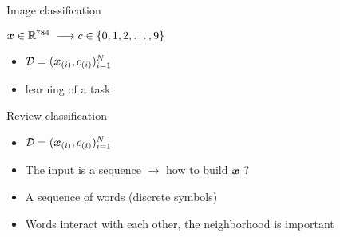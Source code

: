 \begin{frame}{Image classification}
  \begin{center}
    $\boldsymbol{x} \in \mathbb{R}^{784} \ \longrightarrow {c}  \in\{0, 1,2, \ldots ,9
    \}$
  \end{center}
  \begin{itemize}
  \item $\mathcal{D}= (\boldsymbol{x}_{(i)} , {c}_{(i)} )_{i=1}^{N}$ 
  \item {} learning of a  task
  \end{itemize}
\end{frame}

\begin{frame}{Review classification}
  \begin{center}
  \end{center}

  \begin{itemize}
  \item $\mathcal{D}= (\boldsymbol{x}_{(i)} , {c}_{(i)} )_{i=1}^{N}$ 
  \item The input is a sequence $\rightarrow$ how to build $\boldsymbol{x}$ ? 
  \item A sequence of words (discrete symbols)
  \item Words interact with each other, the neighborhood is important
  \end{itemize}
\end{frame}


